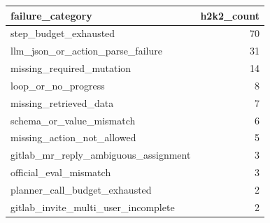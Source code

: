 \begin{tabular}{lr}
\toprule
failure_category & h2k2_count \\
\midrule
step_budget_exhausted & 70 \\
llm_json_or_action_parse_failure & 31 \\
missing_required_mutation & 14 \\
loop_or_no_progress & 8 \\
missing_retrieved_data & 7 \\
schema_or_value_mismatch & 6 \\
missing_action_not_allowed & 5 \\
gitlab_mr_reply_ambiguous_assignment & 3 \\
official_eval_mismatch & 3 \\
planner_call_budget_exhausted & 2 \\
gitlab_invite_multi_user_incomplete & 2 \\
\bottomrule
\end{tabular}

